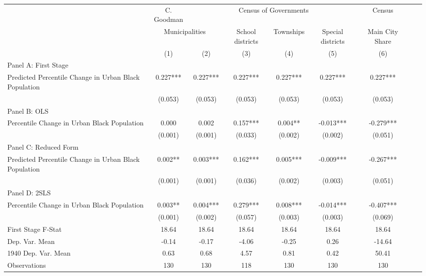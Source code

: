  \begin{tabular}{l*{8}{c}} \toprule
&\multicolumn{1}{c}{C. Goodman}&\multicolumn{4}{c}{Census of Governments}&\multicolumn{1}{c}{Census}\\\cmidrule(lr){2-2}\cmidrule(lr){3-6}\cmidrule(lr){7-7}
&\multicolumn{2}{c}{Municipalities}&\multicolumn{1}{c}{School districts}&\multicolumn{1}{c}{Townships}&\multicolumn{1}{c}{Special districts}&\multicolumn{1}{c}{Main City Share}\\\cmidrule(lr){2-3}\cmidrule(lr){4-6}\cmidrule(lr){7-7}
&\multicolumn{1}{c}{(1)}&\multicolumn{1}{c}{(2)}&\multicolumn{1}{c}{(3)}&\multicolumn{1}{c}{(4)}&\multicolumn{1}{c}{(5)}&\multicolumn{1}{c}{(6)}\\
\cmidrule(lr){1-7}
\multicolumn{6}{l}{Panel A: First Stage}\\
\cmidrule(lr){1-7}
Predicted Percentile Change in Urban Black Population&    0.227***&    0.227***&    0.227***&    0.227***&    0.227***&    0.227***\\
                &  (0.053)   &  (0.053)   &  (0.053)   &  (0.053)   &  (0.053)   &  (0.053)   \\
\cmidrule(lr){1-7}
\multicolumn{6}{l}{Panel B: OLS}\\
\cmidrule(lr){1-7}
Percentile Change in Urban Black Population&    0.000   &    0.002   &    0.157***&    0.004** &   -0.013***&   -0.279***\\
                &  (0.001)   &  (0.001)   &  (0.033)   &  (0.002)   &  (0.002)   &  (0.051)   \\
\cmidrule(lr){1-7}
\multicolumn{6}{l}{Panel C: Reduced Form}\\
\cmidrule(lr){1-7}
Predicted Percentile Change in Urban Black Population&    0.002** &    0.003***&    0.162***&    0.005***&   -0.009***&   -0.267***\\
                &  (0.001)   &  (0.001)   &  (0.036)   &  (0.002)   &  (0.003)   &  (0.051)   \\
\cmidrule(lr){1-7}
\multicolumn{6}{l}{Panel D: 2SLS}\\
\cmidrule(lr){1-7}
Percentile Change in Urban Black Population&    0.003** &    0.004***&    0.279***&    0.008***&   -0.014***&   -0.407***\\
                &  (0.001)   &  (0.002)   &  (0.057)   &  (0.003)   &  (0.003)   &  (0.069)   \\
\midrule
First Stage F-Stat&    18.64   &    18.64   &    18.64   &    18.64   &    18.64   &    18.64   \\
Dep. Var. Mean  &    -0.14   &    -0.17   &    -4.06   &    -0.25   &     0.26   &   -14.64   \\
1940 Dep. Var. Mean&     0.63   &     0.68   &     4.57   &     0.81   &     0.42   &    50.41   \\
Observations    &      130   &      130   &      118   &      130   &      130   &      130   \\
 \bottomrule \end{tabular}
